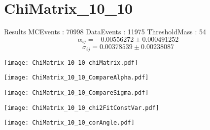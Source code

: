 \documentclass[a4paper,12pt]{article}
\begin{document}
\section{ChiMatrix\_10\_10}
\begin{minipage}{0.49\linewidth} Results \newline
MCEvents : 70998\newline
DataEvents : 11975 \newline
ThresholdMass : 54\\
$$\alpha_{ij} = -0.00556272\pm 0.000491252$$
$$\sigma_{ij} = 0.00378539\pm 0.00238087$$
\end{minipage}\hfill
\begin{minipage}{0.49\linewidth} 
\texttt{[image: ChiMatrix\_10\_10\_chiMatrix.pdf]}\\
\end{minipage}
\hfill
\begin{minipage}{0.49\linewidth} 
\texttt{[image: ChiMatrix\_10\_10\_CompareAlpha.pdf]}\\
\end{minipage}
\hfill
\begin{minipage}{0.49\linewidth} 
\texttt{[image: ChiMatrix\_10\_10\_CompareSigma.pdf]}\\
\end{minipage}
\begin{minipage}{0.49\linewidth} 
\texttt{[image: ChiMatrix\_10\_10\_chi2FitConstVar.pdf]}\\
\end{minipage}
\hfill
\begin{minipage}{0.49\linewidth} 
\texttt{[image: ChiMatrix\_10\_10\_corAngle.pdf]}\\
\end{minipage}
\end{document}
